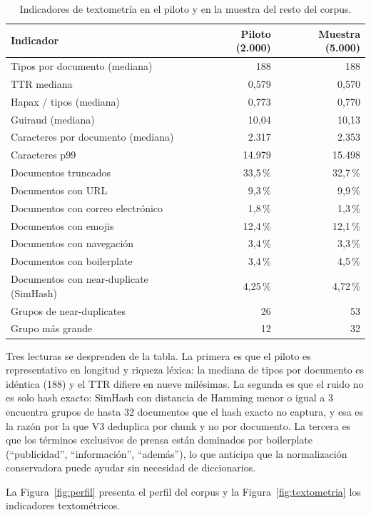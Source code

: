 \documentclass[11pt]{tg_usta}
\begin{document}
\begin{table}[htbp]
\centering
\footnotesize
\begin{tabular}{lrr}
\toprule
Indicador & Piloto (2.000) & Muestra (5.000) \\
\midrule
Tipos por documento (mediana) & 188 & 188 \\
TTR mediana & 0,579 & 0,570 \\
Hapax / tipos (mediana) & 0,773 & 0,770 \\
Guiraud (mediana) & 10,04 & 10,13 \\
Caracteres por documento (mediana) & 2.317 & 2.353 \\
Caracteres p99 & 14.979 & 15.498 \\
Documentos truncados & 33,5\,\% & 32,7\,\% \\
Documentos con URL & 9,3\,\% & 9,9\,\% \\
Documentos con correo electrónico & 1,8\,\% & 1,3\,\% \\
Documentos con emojis & 12,4\,\% & 12,1\,\% \\
Documentos con navegación & 3,4\,\% & 3,3\,\% \\
Documentos con boilerplate & 3,4\,\% & 4,5\,\% \\
Documentos con near-duplicate (SimHash) & 4,25\,\% & 4,72\,\% \\
Grupos de near-duplicates & 26 & 53 \\
Grupo más grande & 12 & 32 \\
\bottomrule
\end{tabular}
\caption{Indicadores de textometría en el piloto y en la muestra del resto del corpus.}
\label{tab:textometria}
\end{table}

Tres lecturas se desprenden de la tabla. La primera es que el piloto es representativo en longitud y riqueza léxica: la mediana de tipos por documento es idéntica (188) y el TTR difiere en nueve milésimas. La segunda es que el ruido no es solo hash exacto: SimHash con distancia de Hamming menor o igual a 3 encuentra grupos de hasta 32 documentos que el hash exacto no captura, y esa es la razón por la que V3 deduplica por chunk y no por documento. La tercera es que los términos exclusivos de prensa están dominados por boilerplate (``publicidad'', ``información'', ``además''), lo que anticipa que la normalización conservadora puede ayudar sin necesidad de diccionarios.

La Figura~\ref{fig:perfil} presenta el perfil del corpus y la Figura~\ref{fig:textometria} los indicadores textométricos.
\end{document}
